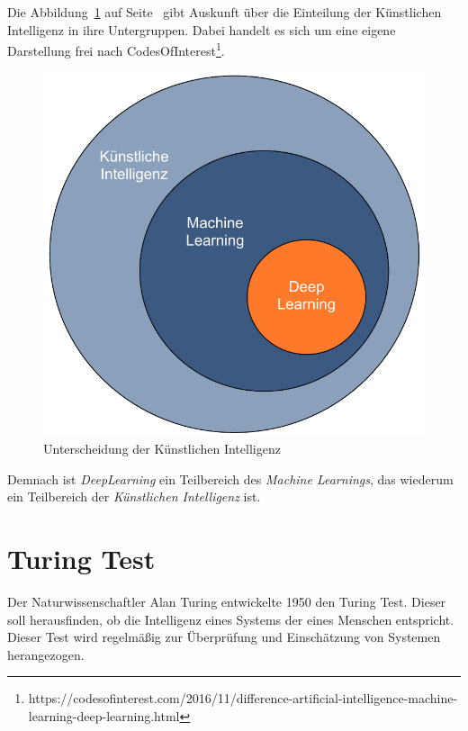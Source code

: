 Die Abbildung~\ref{fig:grundlagen_artificialintelligence} auf Seite~\pageref{fig:grundlagen_artificialintelligence} gibt
Auskunft über die Einteilung der Künstlichen Intelligenz in ihre Untergruppen. Dabei handelt es sich um eine eigene
Darstellung frei nach CodesOfInterest\footnote{https://codesofinterest.com/2016/11/difference-artificial-intelligence-machine-learning-deep-learning.html}.

\begin{figure}[h]
    \centering
    \includegraphics[scale=0.55]{images/kapitel_2/kuenstliche_intelligenz.pdf}
    \caption{Unterscheidung der Künstlichen Intelligenz}
    \label{fig:grundlagen_artificialintelligence}
\end{figure}

Demnach ist \textit{DeepLearning} ein Teilbereich des \textit{Machine Learnings}, das wiederum ein Teilbereich der
\textit{Künstlichen Intelligenz} ist.

\section{Turing Test}
Der Naturwissenschaftler Alan Turing entwickelte 1950 den Turing Test. Dieser soll herausfinden, ob die Intelligenz eines
Systems der eines Menschen entspricht. Dieser Test wird regelmäßig zur Überprüfung und Einschätzung von Systemen
herangezogen.

